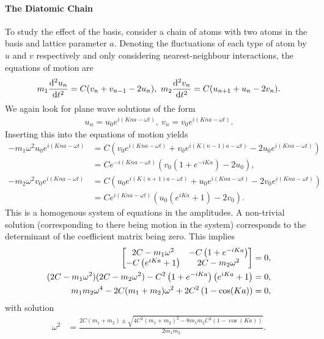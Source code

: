 \paragraph{The Diatomic Chain}
To study the effect of the basis, consider a chain of atoms with two atoms in the basis and lattice parameter $a$. Denoting the fluctuations of each type of atom by $u$ and $v$ respectively and only considering nearest-neighbour interactions, the equations of motion are
\begin{align*}
	m_{1}\dv[2]{u_{n}}{t} = C(v_{n} + v_{n - 1} - 2u_{n}),\ m_{2}\dv[2]{v_{n}}{t} = C(u_{n + 1} + u_{n} - 2v_{n}).
\end{align*}
We again look for plane wave solutions of the form
\begin{align*}
	u_{n} = u_{0}e^{i(Kna - \omega t)},\ v_{n} = v_{0}e^{i(Kna - \omega t)}.
\end{align*}
Inserting this into the equations of motion yields
\begin{align*}
	-m_{1}\omega^{2}u_{0}e^{i(Kna - \omega t)} &= C\left(v_{0}e^{i(Kna - \omega t)} + v_{0}e^{i(K(n - 1)a - \omega t)} - 2u_{0}e^{i(Kna - \omega t)}\right) \\
	                                           &= Ce^{-i(Kna - \omega t)}\left(v_{0}\left(1 + e^{-iKa}\right) - 2u_{0}\right), \\
	-m_{2}\omega^{2}v_{0}e^{i(Kna - \omega t)} &= C\left(u_{0}e^{i(K(n + 1)a - \omega t)} + u_{0}e^{i(Kna - \omega t)} - 2v_{0}e^{i(Kna - \omega t)}\right) \\
	                                           &= Ce^{i(Kna - \omega t)}\left(u_{0}\left(e^{iKa} + 1\right) - 2v_{0}\right).
\end{align*}
This is a homogenous system of equations in the amplitudes. A non-trivial solution (corresponding to there being motion in the system) corresponds to the determinant of the coefficient matrix being zero. This implies
\begin{align*}
	\mqty
	[
		2C - m_{1}\omega^{2}       & -C\left(1 + e^{-iKa}\right) \\
		-C\left(e^{iKa} + 1\right) & 2C - m_{2}\omega^{2}
	]
	&= 0, \\
	(2C - m_{1}\omega^{2})(2C - m_{2}\omega^{2}) - C^{2}\left(1 + e^{-iKa}\right)\left(e^{iKa} + 1\right) &= 0, \\
	m_{1}m_{2}\omega^{4} - 2C(m_{1} + m_{2})\omega^{2} + 2C^{2}\left(1 - \cos(Ka)\right) &= 0,
\end{align*}
with solution
\begin{align*}
	\omega^{2} &= \frac{2C(m_{1} + m_{2}) \pm \sqrt{4C^{2}(m_{1} + m_{2})^{2} - 8m_{1}m_{2}C^{2}\left(1 - \cos(Ka)\right)}}{2m_{1}m_{2}}.
\end{align*}

